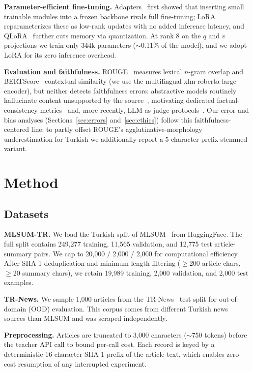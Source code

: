 \documentclass[conference]{IEEEtran}
\begin{document}
\textbf{Parameter-efficient fine-tuning.} Adapters~\cite{houlsby2019adapters} first showed that inserting small trainable modules into a frozen backbone rivals full fine-tuning; LoRA~\cite{hu2021lora} reparameterizes these as low-rank updates with no added inference latency, and QLoRA~\cite{dettmers2023qlora} further cuts memory via quantization. At rank 8 on the $q$ and $v$ projections we train only 344k parameters ($\sim$0.11\% of the model), and we adopt LoRA for its zero inference overhead.

\textbf{Evaluation and faithfulness.} ROUGE~\cite{lin2004rouge} measures lexical $n$-gram overlap and BERTScore~\cite{zhang2020bertscore} contextual similarity (we use the multilingual xlm-roberta-large encoder), but neither detects faithfulness errors: abstractive models routinely hallucinate content unsupported by the source~\cite{maynez2020faithfulness}, motivating dedicated factual-consistency metrics~\cite{kryscinski2020factcc} and, more recently, LLM-as-judge protocols~\cite{zheng2023judging}. Our error and bias analyses (Sections~\ref{sec:errors} and~\ref{sec:ethics}) follow this faithfulness-centered line; to partly offset ROUGE's agglutinative-morphology underestimation for Turkish we additionally report a 5-character prefix-stemmed variant.

\section{Method}
\label{sec:method}
\subsection{Datasets}
\textbf{MLSUM-TR.} We load the Turkish split of MLSUM~\cite{scialom2020mlsum} from HuggingFace. The full split contains 249{,}277 training, 11{,}565 validation, and 12{,}775 test article-summary pairs. We cap to 20{,}000 / 2{,}000 / 2{,}000 for computational efficiency. After SHA-1 deduplication and minimum-length filtering ($\geq$200 article chars, $\geq$20 summary chars), we retain 19{,}989 training, 2{,}000 validation, and 2{,}000 test examples.

\textbf{TR-News.} We sample 1{,}000 articles from the TR-News~\cite{baykara2022trnews} test split for out-of-domain (OOD) evaluation. This corpus comes from different Turkish news sources than MLSUM and was scraped independently.

\textbf{Preprocessing.} Articles are truncated to 3{,}000 characters ($\sim$750 tokens) before the teacher API call to bound per-call cost. Each record is keyed by a deterministic 16-character SHA-1 prefix of the article text, which enables zero-cost resumption of any interrupted experiment.
\end{document}
